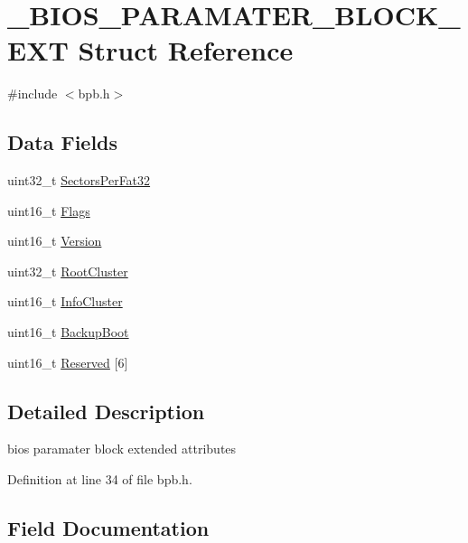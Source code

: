 \hypertarget{struct__BIOS__PARAMATER__BLOCK__EXT}{}\section{\+\_\+\+B\+I\+O\+S\+\_\+\+P\+A\+R\+A\+M\+A\+T\+E\+R\+\_\+\+B\+L\+O\+C\+K\+\_\+\+E\+XT Struct Reference}
\label{struct__BIOS__PARAMATER__BLOCK__EXT}


{\ttfamily \#include $<$bpb.\+h$>$}

\subsection*{Data Fields}
\begin{DoxyCompactItemize}
\item 
uint32\+\_\+t \hyperlink{struct__BIOS__PARAMATER__BLOCK__EXT_acfed1dbed7039b6789e6351ebacee24a}{Sectors\+Per\+Fat32}
\item 
uint16\+\_\+t \hyperlink{struct__BIOS__PARAMATER__BLOCK__EXT_a792e2adce56f9d75b1ae4b7a072da57f}{Flags}
\item 
uint16\+\_\+t \hyperlink{struct__BIOS__PARAMATER__BLOCK__EXT_a75c0e772bb6d509159a7ddb90f1567a7}{Version}
\item 
uint32\+\_\+t \hyperlink{struct__BIOS__PARAMATER__BLOCK__EXT_aac74e28a6f93ca8e26d8675ef150487e}{Root\+Cluster}
\item 
uint16\+\_\+t \hyperlink{struct__BIOS__PARAMATER__BLOCK__EXT_a0ece333302e2be2993066c7b69b4a3c6}{Info\+Cluster}
\item 
uint16\+\_\+t \hyperlink{struct__BIOS__PARAMATER__BLOCK__EXT_a6d35f095d874ab3b5f12ad6d79efc2a7}{Backup\+Boot}
\item 
uint16\+\_\+t \hyperlink{struct__BIOS__PARAMATER__BLOCK__EXT_a49ffb182c5b3f929ab64f7b502237bfe}{Reserved} \mbox{[}6\mbox{]}
\end{DoxyCompactItemize}


\subsection{Detailed Description}
bios paramater block extended attributes 

Definition at line 34 of file bpb.\+h.



\subsection{Field Documentation}
